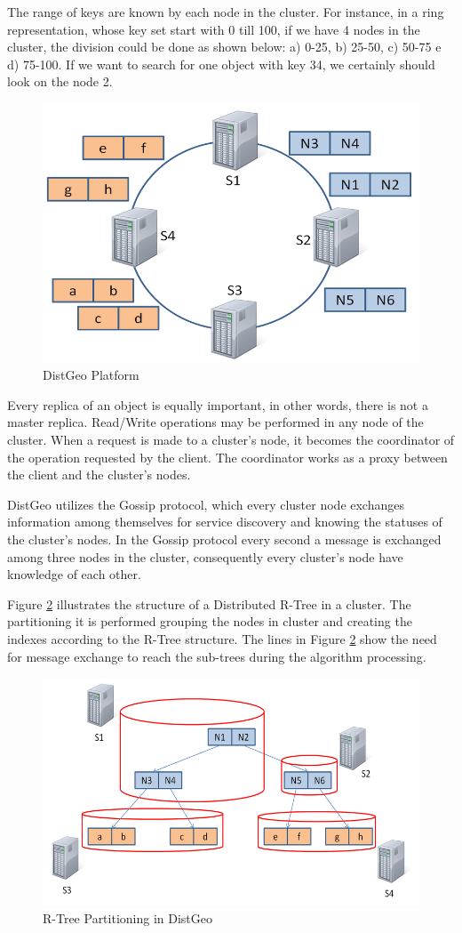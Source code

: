 	The range of keys are known by each node in the cluster. For instance, in a ring representation, whose key set start with 0 till 100, if we have 4 nodes in the cluster, the division could be done as shown below: a) 0-25, b) 25-50, c) 50-75 e d) 75-100. If we want to search for one object with key 34, we certainly should look on the node 2.

\begin{figure}[ht]
\centering
\includegraphics[width=.45\textwidth]{figure3.png}
\caption{DistGeo Platform}
\label{fig: Figure 3}
\end{figure}
	
	Every replica of an object is equally important, in other words, there is not a master replica. Read/Write operations may be performed in any node of the cluster. When a request is made to a cluster's node, it becomes the coordinator of the operation requested by the client. The coordinator works as a proxy between the client and the cluster's nodes. 
	
	DistGeo utilizes the Gossip protocol, which every cluster node exchanges information among themselves for service discovery and knowing the statuses of the cluster's nodes. In the Gossip protocol every second a message is exchanged among three nodes in the cluster, consequently every cluster's node have knowledge of each other. 

Figure \ref{fig:partitioning} illustrates the structure of a Distributed R-Tree in a cluster. The partitioning it is performed grouping the nodes in cluster and creating the indexes according to the R-Tree structure. The lines in Figure \ref{fig:partitioning} show the need for message exchange to reach the sub-trees during the algorithm processing. 

\begin{figure}[ht]
\centering
\includegraphics[width=.5\textwidth]{r-tree-partiotioning.png}
\caption{R-Tree Partitioning in DistGeo}
\label{fig:partitioning}
\end{figure}

